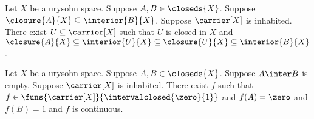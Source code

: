 \begin{theorem}\label{urysohnsetinbeetween}
    Let $X$ be a urysohn space.
    Suppose $A,B \in \closeds{X}$.
    Suppose $\closure{A}{X} \subseteq \interior{B}{X}$.
    Suppose $\carrier[X]$ is inhabited.
    There exist $U \subseteq \carrier[X]$ such that $U$ is closed in $X$ and $\closure{A}{X} \subseteq \interior{U}{X} \subseteq \closure{U}{X} \subseteq \interior{B}{X}$.
\end{theorem}


\begin{theorem}\label{urysohn}
    Let $X$ be a urysohn space.
    Suppose $A,B \in \closeds{X}$.
    Suppose $A \inter B$ is empty.
    Suppose $\carrier[X]$ is inhabited.
    There exist $f$ such that $f \in \funs{\carrier[X]}{\intervalclosed{\zero}{1}}$ 
    and $f(A) = \zero$ and $f(B)= 1$ and $f$ is continuous.
\end{theorem}

